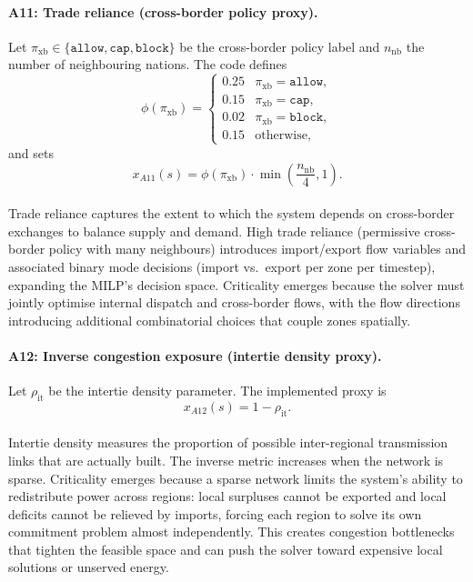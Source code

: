 \documentclass{article}
\begin{document}
\paragraph{A11: Trade reliance (cross-border policy proxy).}
Let $\pi_{\mathrm{xb}}\in\{\texttt{allow},\texttt{cap},\texttt{block}\}$ be the cross-border policy label and $n_{\mathrm{nb}}$ the number of neighbouring nations.
The code defines
\begin{equation}
\phi(\pi_{\mathrm{xb}})=
\begin{cases}
0.25 & \pi_{\mathrm{xb}}=\texttt{allow},\\
0.15 & \pi_{\mathrm{xb}}=\texttt{cap},\\
0.02 & \pi_{\mathrm{xb}}=\texttt{block},\\
0.15 & \text{otherwise,}
\end{cases}
\end{equation}
and sets
\begin{equation}
x_{A11}(s)=\phi(\pi_{\mathrm{xb}})\cdot \min\!\left(\frac{n_{\mathrm{nb}}}{4},1\right).
\end{equation}

\paragraph{}Trade reliance captures the extent to which the system depends on cross-border exchanges to balance supply and demand. High trade reliance (permissive cross-border policy with many neighbours) introduces import/export flow variables and associated binary mode decisions (import vs.\ export per zone per timestep), expanding the MILP's decision space. Criticality emerges because the solver must jointly optimise internal dispatch and cross-border flows, with the flow directions introducing additional combinatorial choices that couple zones spatially.

\paragraph{A12: Inverse congestion exposure (intertie density proxy).}
Let $\rho_{\mathrm{it}}$ be the intertie density parameter. The implemented proxy is
\begin{equation}
x_{A12}(s)=1-\rho_{\mathrm{it}}.
\end{equation}

\paragraph{}Intertie density measures the proportion of possible inter-regional transmission links that are actually built. The inverse metric increases when the network is sparse. Criticality emerges because a sparse network limits the system's ability to redistribute power across regions: local surpluses cannot be exported and local deficits cannot be relieved by imports, forcing each region to solve its own commitment problem almost independently. This creates congestion bottlenecks that tighten the feasible space and can push the solver toward expensive local solutions or unserved energy.
\end{document}
